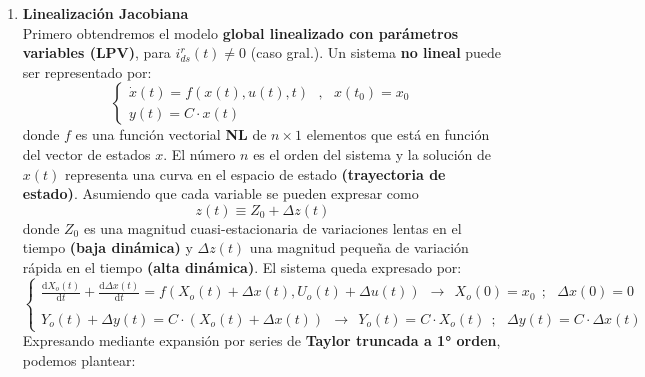 \documentclass[10pt]{article}
\begin{document}
\begin{enumerate}
	\item \textbf{Linealización Jacobiana}
    \vspace{0.3cm} 
    \\Primero obtendremos el modelo \textbf{global linealizado con parámetros variables (LPV)}, para $ i_{ds}^{r}\left( t \right ) \neq 0 $ (caso gral.). 
    Un sistema \textbf{no lineal} puede ser representado por:
    \begin{equation}
		\begin{cases}
			\dot{x}\left ( t \right )= f\left ( x\left ( t \right ),u\left ( t \right ),t \right ) \ \ \ ,\ \ \ x\left ( t_{0} \right )=x_{0}
			\\
			y\left ( t \right )= C \cdot x\left ( t \right )
		\end{cases}
    \end{equation}
    donde $f$ es una función vectorial \textbf{NL} de $n\times 1$ elementos que está en función del vector de estados $x$.
    El número $n$ es el orden del sistema y la solución de $x(t)$ representa una curva en el espacio de estado \textbf{(trayectoria de estado)}.
    Asumiendo que cada variable se pueden expresar como
    \begin{equation}
        z\left ( t \right )\equiv Z_{0} + \Delta z\left ( t \right )
    \end{equation}
    donde $Z_{0}$ es una magnitud cuasi-estacionaria de variaciones lentas en el tiempo \textbf{(baja dinámica)} y $\Delta z(t)$ una magnitud pequeña de variación rápida en el tiempo \textbf{(alta dinámica)}.
    El sistema queda expresado por:
    \begin{equation}
        \begin{cases}
            \frac{\mathrm{d} X_{o}\left ( t \right )}{\mathrm{d} t}+
            \frac{\mathrm{d} \Delta x\left ( t \right )}{\mathrm{d} t}
            =
            f\left ( X_{o}\left ( t \right )+\Delta x\left ( t \right ),U_{o}\left ( t \right )+\Delta u\left ( t \right ) \right )
            \ \ \rightarrow \ \ 
            X_{o}\left ( 0 \right )=x_{0}\ \ ;\ \ \ \Delta x\left ( 0 \right )=0
			\\
			\\
			Y_{o}(t)+\Delta y(t)=C\cdot (X_{o}\left ( t \right )+\Delta x\left ( t \right ))
			\ \ \rightarrow \ \ 
			Y_{o}\left ( t \right )=C\cdot X_{o}(t)\ \ ;\ \ \ \Delta y\left ( t \right )=C\cdot \Delta x\left ( t \right )
        \end{cases}
    \end{equation}
	Expresando mediante expansión por series de \textbf{Taylor truncada a 1° orden}, podemos plantear:

\end{enumerate}
\end{document}
